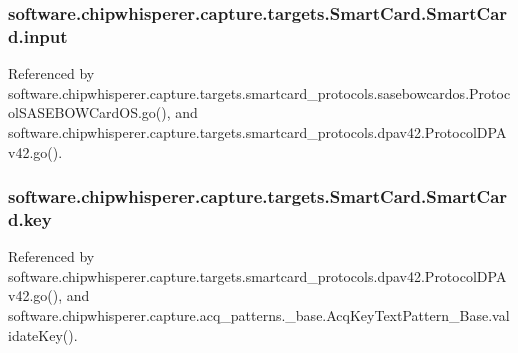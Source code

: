 \hypertarget{classsoftware_1_1chipwhisperer_1_1capture_1_1targets_1_1SmartCard_1_1SmartCard_a973299d481b616299f0fd3a9cba55bab}{}
\subsubsection[{input}]{\setlength{\rightskip}{0pt plus 5cm}software.\+chipwhisperer.\+capture.\+targets.\+Smart\+Card.\+Smart\+Card.\+input}\label{classsoftware_1_1chipwhisperer_1_1capture_1_1targets_1_1SmartCard_1_1SmartCard_a973299d481b616299f0fd3a9cba55bab}


Referenced by software.\+chipwhisperer.\+capture.\+targets.\+smartcard\+\_\+protocols.\+sasebowcardos.\+Protocol\+S\+A\+S\+E\+B\+O\+W\+Card\+O\+S.\+go(), and software.\+chipwhisperer.\+capture.\+targets.\+smartcard\+\_\+protocols.\+dpav42.\+Protocol\+D\+P\+Av42.\+go().

\hypertarget{classsoftware_1_1chipwhisperer_1_1capture_1_1targets_1_1SmartCard_1_1SmartCard_aac6e85e066a550080b51a3954bae4392}{}
\subsubsection[{key}]{\setlength{\rightskip}{0pt plus 5cm}software.\+chipwhisperer.\+capture.\+targets.\+Smart\+Card.\+Smart\+Card.\+key}\label{classsoftware_1_1chipwhisperer_1_1capture_1_1targets_1_1SmartCard_1_1SmartCard_aac6e85e066a550080b51a3954bae4392}


Referenced by software.\+chipwhisperer.\+capture.\+targets.\+smartcard\+\_\+protocols.\+dpav42.\+Protocol\+D\+P\+Av42.\+go(), and software.\+chipwhisperer.\+capture.\+acq\+\_\+patterns.\+\_\+base.\+Acq\+Key\+Text\+Pattern\+\_\+\+Base.\+validate\+Key().

\hypertarget{classsoftware_1_1chipwhisperer_1_1capture_1_1targets_1_1SmartCard_1_1SmartCard_a70bb91d5c2c8be604a549ed5ee23510a}{}
